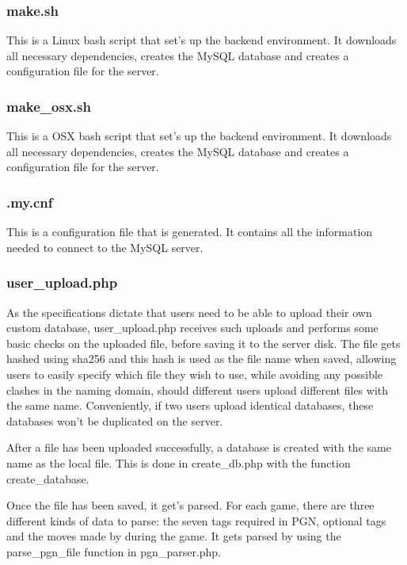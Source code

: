 \documentclass{article}
\begin{document}
\subsubsection{make.sh}
This is a Linux bash script that set's up the backend environment.
It downloads all necessary dependencies, creates the MySQL database
and creates a configuration file for the server.

\subsubsection{make\_osx.sh}
This is a OSX bash script that set's up the backend environment.
It downloads all necessary dependencies, creates the MySQL database and
creates a configuration file for the server.

\subsubsection{.my.cnf}
This is a configuration file that is generated. It contains all the
information needed to connect to the MySQL server.

\subsubsection{user\_upload.php}
As the specifications dictate that users need to be able to upload their own
custom database, user\_upload.php receives such uploads and
performs some basic checks on the uploaded file, before saving it to the
server disk. The file gets hashed using sha256 and this hash is used as
the file name when saved, allowing users to easily specify which file
they wish to use, while avoiding any possible clashes in the naming
domain, should different users upload different files with the same name.
Conveniently, if two users upload identical databases, these databases
won't be duplicated on the server.

After a file has been uploaded successfully, a database is created with
the same name as the local file. This is done in create\_db.php with
the function create\_database.

Once the file has been saved, it get's parsed. For each game, there are
three different kinds of data to parse: the seven tags required in PGN,
optional tags and the moves made by during the game. It gets parsed by
using the parse\_pgn\_file function in pgn\_parser.php.
\end{document}
